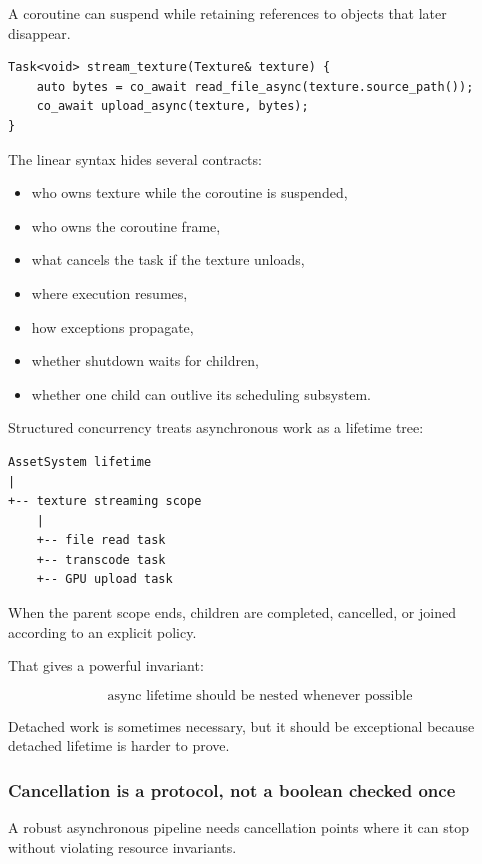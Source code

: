 A coroutine can suspend while retaining references to objects that later disappear.

\begin{verbatim}
Task<void> stream_texture(Texture& texture) {
    auto bytes = co_await read_file_async(texture.source_path());
    co_await upload_async(texture, bytes);
}
\end{verbatim}

The linear syntax hides several contracts:

\begin{itemize}
\tightlist
\item
  who owns texture while the coroutine is suspended,
\item
  who owns the coroutine frame,
\item
  what cancels the task if the texture unloads,
\item
  where execution resumes,
\item
  how exceptions propagate,
\item
  whether shutdown waits for children,
\item
  whether one child can outlive its scheduling subsystem.
\end{itemize}

Structured concurrency treats asynchronous work as a lifetime tree:

\begin{verbatim}
AssetSystem lifetime
|
+-- texture streaming scope
    |
    +-- file read task
    +-- transcode task
    +-- GPU upload task
\end{verbatim}

When the parent scope ends, children are completed, cancelled, or joined according to an explicit policy.

That gives a powerful invariant:

\[
\boxed{
\text{async lifetime should be nested whenever possible}
}
\]

Detached work is sometimes necessary, but it should be exceptional because detached lifetime is harder to prove.

\subsubsection{Cancellation is a protocol, not a boolean checked once}\label{01-foundations-i-ch005-cancellation-is-a-protocol-not-a-boolean-checked-once}

A robust asynchronous pipeline needs cancellation points where it can stop without violating resource invariants.

